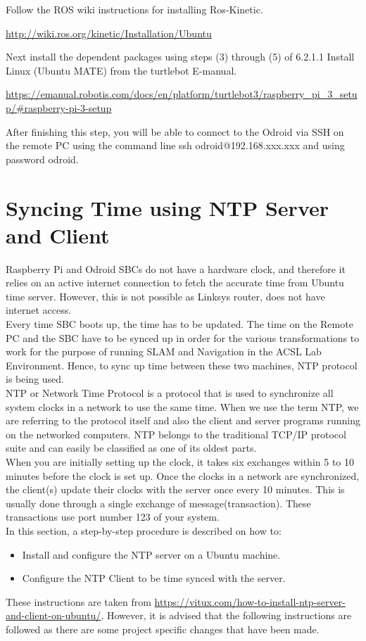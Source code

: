 \documentclass[12]{article}
\begin{document}
Follow the ROS wiki instructions for installing Ros-Kinetic.


\url{

http://wiki.ros.org/kinetic/Installation/Ubuntu}


Next install the dependent packages using steps (3) through (5) of 6.2.1.1 Install Linux (Ubuntu MATE) from the turtlebot E-manual.


\url{

https://emanual.robotis.com/docs/en/platform/turtlebot3/raspberry_pi_3_setup/#raspberry-pi-3-setup}


 

After finishing this step, you will be able to connect to the Odroid via SSH on the remote PC using the command line ssh odroid@192.168.xxx.xxx and using password odroid. 
\newpage
\section{Syncing Time using NTP Server and Client}
Raspberry Pi and Odroid SBCs do not have a hardware clock, and therefore it relies on an active internet connection to fetch the accurate time from Ubuntu time server. However, this is not possible as Linksys router, does not have internet access.\\
Every time SBC boots up, the time has to be updated. The time on the Remote PC and the SBC have to be synced up in order for the various transformations to work for the purpose of running SLAM and Navigation in the ACSL Lab Environment. Hence, to sync up time between these two machines, NTP protocol is being used.\\
NTP or Network Time Protocol is a protocol that is used to synchronize all system clocks in a network to use the same time. When we use the term NTP, we are referring to the protocol itself and also the client and server programs running on the networked computers. NTP belongs to the traditional TCP/IP protocol suite and can easily be classified as one of its oldest parts.\\
When you are initially setting up the clock, it takes six exchanges within 5 to 10 minutes before the clock is set up. Once the clocks in a network are synchronized, the client(s) update their clocks with the server once every 10 minutes. This is usually done through a single exchange of message(transaction). These transactions use port number 123 of your system.\\
In this section, a step-by-step procedure is described on how to:
\begin{itemize}
	\item{Install and configure the NTP server on a Ubuntu machine.}
	\item{Configure the NTP Client to be time synced with the server.}
\end{itemize}
These instructions are taken from \url{https://vitux.com/how-to-install-ntp-server-and-client-on-ubuntu/}. However, it is advised that the following instructions are followed as there are some project specific changes that have been made.
\end{document}
